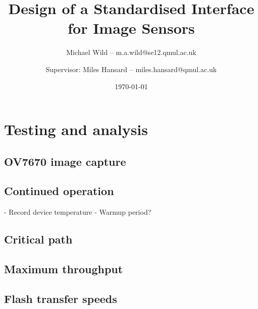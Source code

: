 \documentclass[a4paper,11pt]{report}
\title{Design of a Standardised Interface for Image Sensors}
\author{Michael Wild -- m.a.wild@se12.qmul.ac.uk \and Supervisor: Miles Hansard -- miles.hansard@qmul.ac.uk}
\date{\today}
\begin{document}
  \maketitle
  

  \tableofcontents
  \listoffigures
  \listoftables
  \lstlistoflistings

  
  
  
  
  

  \chapter{Testing and analysis}
    \section{OV7670 image capture}
    \section{Continued operation}
    - Record device temperature
    - Warmup period?
    \section{Critical path}
    \section{Maximum throughput}
    \section{Flash transfer speeds}

  

  


  
  \printglossary[type=\acronymtype]
\end{document}
